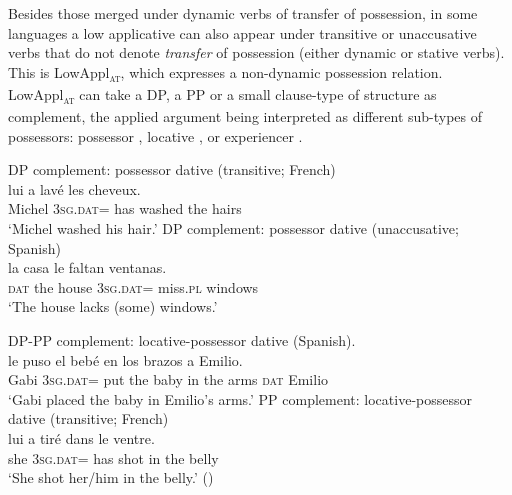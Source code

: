 \documentclass[output=paper,colorlinks,citecolor=brown,modfonts,nonflat]{langsci/langscibook}
\begin{document}
Besides those merged under dynamic verbs of transfer of possession, in some languages a low applicative can also appear under transitive or unaccusative verbs that do not denote \textit{transfer} of possession (either dynamic or stative verbs). This is  LowAppl\textsc{\textsubscript{at}}, which expresses a non-dynamic possession relation. LowAppl\textsc{\textsubscript{at}} can take  a DP, a PP or a small clause-type of structure as complement, the applied argument being interpreted as different sub-types of possessors: possessor , locative , or experiencer .

\ea%
    \label{ex:cuervo:6}
    \ea%
        \label{ex:cuervo:6a}
        DP complement: possessor dative (transitive; French)\\
         {lui} {a} {lavé} {les} {cheveux}.\\
        Michel 3\textsc{sg.dat}= has washed the hairs\\
        \glt ‘Michel washed his hair.’
    \ex%
        \label{ex:cuervo:6b}
        DP complement: possessor dative (unaccusative; Spanish)\\
         {la} {casa} {le} {faltan} {ventanas}.\\
        \textsc{dat} the house 3\textsc{sg.dat}= miss.\textsc{pl} windows\\
        \glt ‘The house lacks (some) windows.’
    \z
\z

\ea%
    \label{ex:cuervo:7}
    \ea%
        \label{ex:cuervo:7a}
        DP-PP complement: locative-possessor dative (Spanish).\\
         {le} {puso} {el} {bebé}  {en} {los} {brazos} {a} {Emilio}.\\
        Gabi 3\textsc{sg.dat}= put the baby in the arms \textsc{dat} Emilio \\
        \glt ‘Gabi placed the baby in Emilio’s arms.’
    \ex%
        \label{ex:cuervo:7b}
        PP complement: locative-possessor dative (transitive; French)\\
         {lui} {a} {tiré} {dans} {le} {ventre}.\\
        she 3\textsc{sg.dat}= has shot in the belly\\
        \glt ‘She shot her/him in the belly.’  (\citealt{BonehNash2012})
    \z
\z
\end{document}
